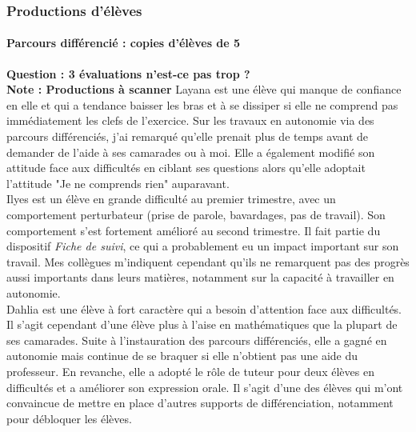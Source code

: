 \subsubsection*{Productions d'élèves}\label{Prod_eleves_ju}
\paragraph{Parcours différencié : copies d'élèves de 5 \\}
\textbf{\color{red} Question : 3 évaluations n'est-ce pas trop ?\\ Note : Productions à scanner}
Layana est une élève qui manque de confiance en elle et qui a tendance  baisser les bras et à se dissiper si elle ne comprend pas immédiatement les clefs de l'exercice. Sur les travaux en autonomie via des parcours différenciés, j'ai remarqué qu'elle prenait plus de temps avant de demander de l'aide à ses camarades ou à moi. Elle a également modifié son attitude face aux difficultés en ciblant ses questions alors qu'elle adoptait l'attitude "Je ne comprends rien" auparavant.\\
Ilyes est un élève en grande difficulté au premier trimestre, avec un comportement perturbateur (prise de parole, bavardages, pas de travail). Son comportement s'est fortement amélioré au second trimestre. Il fait partie du dispositif \textit{Fiche de suivi}, ce qui a probablement eu un impact important sur son travail. Mes collègues m'indiquent cependant qu'ils ne remarquent pas des progrès aussi importants dans leurs matières, notamment sur la capacité à travailler en autonomie.\\
Dahlia est une élève à fort caractère qui a besoin d'attention face aux difficultés. Il s'agit cependant d'une élève plus à l'aise en mathématiques que la plupart de ses camarades. Suite à l'instauration des parcours différenciés, elle a gagné en autonomie mais continue de se braquer si elle n'obtient pas une aide du professeur. En revanche, elle a adopté le rôle de tuteur pour deux élèves en difficultés et a améliorer son expression orale. Il s'agit d'une des élèves qui m'ont convaincue de mettre en place d'autres supports de différenciation, notamment pour débloquer les élèves.
